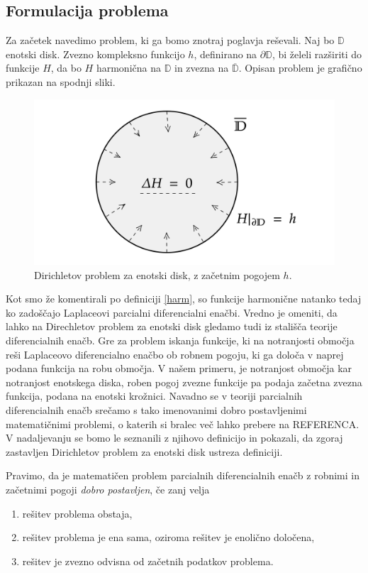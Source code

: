 \documentclass[mat1, tisk]{fmfdelo}
\begin{document}
\subsection{Formulacija problema}
    Za začetek navedimo problem, ki ga bomo znotraj poglavja reševali.
    Naj bo $\mathbb{D}$ enotski disk. Zvezno kompleksno funkcijo $h$, definirano na $\partial \mathbb{D}$, bi želeli razširiti do funkcije $H$, da bo $H$ harmonična na $\mathbb{D}$ in zvezna na $\overline{\mathbb{D}}$.
    Opisan problem je grafično prikazan na spodnji sliki. 
    \begin{figure}[H]
        \begin{center}
            \includegraphics[width = 0.7 \textwidth]{dirichlet_form.png}
            \caption{Dirichletov problem za enotski disk, z začetnim pogojem $h$.}
        \end{center}    
    \end{figure}

    Kot smo že komentirali po definiciji \ref{harm}, so funkcije harmonične natanko tedaj ko zadoščajo Laplaceovi parcialni diferencialni enačbi.   
    Vredno je omeniti, da lahko na Direchletov problem za enotski disk gledamo tudi iz stališča teorije diferencialnih enačb. Gre za problem iskanja funkcije, ki na notranjosti območja reši Laplaceovo diferencialno enačbo ob robnem pogoju, ki ga določa v naprej podana funkcija na robu območja.     
    V našem primeru, je notranjost območja kar notranjost enotskega diska, roben pogoj zvezne funkcije pa podaja začetna zvezna funkcija, podana na enotski krožnici.
    Navadno se v teoriji parcialnih diferencialnih enačb srečamo s tako imenovanimi dobro postavljenimi matematičnimi problemi, o katerih si bralec več lahko prebere na REFERENCA.     
    V nadaljevanju se bomo le seznanili z njihovo definicijo in pokazali, da zgoraj zastavljen Dirichletov problem za enotski disk ustreza definiciji. 

    \begin{definicija}[J. Hadamard, 1902]
        \label{def_dp}
        Pravimo, da je matematičen problem parcialnih diferencialnih enačb z robnimi in začetnimi pogoji \emph{dobro postavljen}, če zanj velja
        \begin{enumerate}[label={\Alph*)}]
            \item rešitev problema obstaja,
            \item rešitev problema je ena sama, oziroma rešitev je enolično določena,
            \item rešitev je zvezno odvisna od začetnih podatkov problema.
        \end{enumerate}
    \end{definicija}
\end{document}
